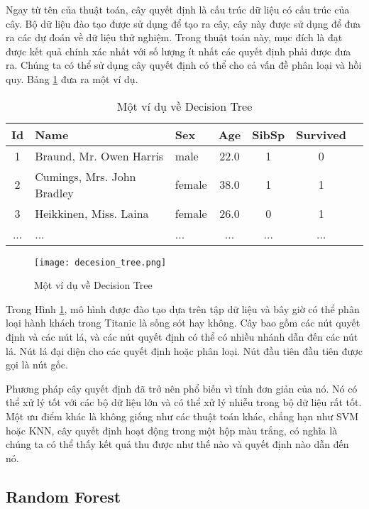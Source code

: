 Ngay từ tên của thuật toán, cây quyết định là cấu trúc dữ liệu có cấu trúc của cây. Bộ dữ liệu đào tạo được sử dụng để tạo ra cây, cây này được sử dụng để đưa ra các dự đoán về dữ liệu thử nghiệm. Trong thuật toán này, mục đích là đạt được kết quả chính xác nhất với số lượng ít nhất các quyết định phải được đưa ra. Chúng ta có thể sử dụng cây quyết định có thể cho cả vấn đề phân loại và hồi quy. Bảng \ref{table:decision-tree} đưa ra một ví dụ.

\begin{table}[h]
\caption{Một ví dụ về Decision Tree}
\centering
\label{table:decision-tree}
\begin{tabular}{c l l c c c c}
\hline
Id & Name                       & Sex    & Age  & SibSp & Survived \\	
\hline
1  & Braund, Mr. Owen Harris    & male   & 22.0	& 1     & 0	\\
2  & Cumings, Mrs. John Bradley & female & 38.0	& 1     & 1	\\
3  & Heikkinen, Miss. Laina	    & female & 26.0	& 0     & 1 \\
...& ...                        & ...    & ...  & ...   & ... \\ 
\hline 
\end{tabular}
\end{table}

\begin{figure}[htbp!] 
\centering    
\texttt{[image: decesion\_tree.png]}
\caption{Một ví dụ về Decision Tree \cite{wikidecesiontree}}
\label{fig:decision-tree}
\end{figure}

Trong Hình \ref{fig:decision-tree}, mô hình được đào tạo dựa trên tập dữ liệu và bây giờ có thể phân loại hành khách trong Titanic là sống sót hay không. Cây bao gồm các nút quyết định và các nút lá, và các nút quyết định có thể có nhiều nhánh dẫn đến các nút lá. Nút lá đại diện cho các quyết định hoặc phân loại. Nút đầu tiên đầu tiên được gọi là nút gốc.

Phương pháp cây quyết định đã trở nên phổ biến vì tính đơn giản của nó. Nó có thể xử lý tốt với các bộ dữ liệu lớn và có thể xử lý nhiễu trong bộ dữ liệu rất tốt. Một ưu điểm khác là không giống như các thuật toán khác, chẳng hạn như SVM hoặc KNN, cây quyết định hoạt động trong một hộp màu trắng, có nghĩa là chúng ta có thể thấy kết quả thu được như thế nào và quyết định nào dẫn đến nó.

\subsection{Random Forest}
\label{ssec:random-forest}

